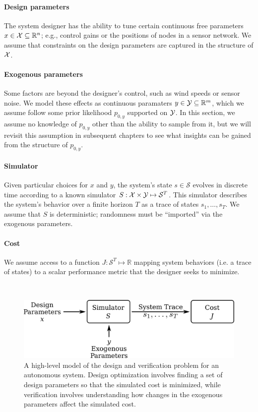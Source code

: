 \paragraph{Design parameters} The system designer has the ability to tune certain continuous free parameters $x \in \mathcal{X} \subseteq \mathbb{R}^n$; e.g., control gains or the positions of nodes in a sensor network. We assume that constraints on the design parameters are captured in the structure of $\mathcal{X}$.

\paragraph{Exogenous parameters} Some factors are beyond the designer's control, such as wind speeds or sensor noise. We model these effects as continuous paramaters $y \in \mathcal{Y} \subseteq \mathbb{R}^m$, which we assume follow some prior likelihood $p_{0, y}$ supported on $\mathcal{Y}$. In this section, we assume no knowledge of $p_{0, y}$ other than the ability to sample from it, but we will revisit this assumption in subsequent chapters to see what insights can be gained from the structure of $p_{0, y}$.

\paragraph{Simulator} Given particular choices for $x$ and $y$, the system's state $s \in \mathcal{S}$ evolves in discrete time according to a known simulator $S : \mathcal{X} \times \mathcal{Y} \mapsto \mathcal{S}^T$. This simulator describes the system's behavior over a finite horizon $T$ as a trace of states $s_1, \ldots, s_T$. We assume that $S$ is deterministic; randomness must be ``imported'' via the exogenous parameters.

\paragraph{Cost} We assume access to a function $J: \mathcal{S}^T \mapsto \mathbb{R}$ mapping system behaviors (i.e. a trace of states) to a scalar performance metric that the designer seeks to minimize.

\ \\

\begin{figure}[tb]
    \centering
    \includegraphics[width=0.6\linewidth]{images/ch5/block_diagram.png}
    \caption{A high-level model of the design and verification problem for an autonomous system. Design optimization involves finding a set of design parameters so that the simulated cost is minimized, while verification involves understanding how changes in the exogenous parameters affect the simulated cost.}
    \label{ch5:fig:block_diagram}
\end{figure}

